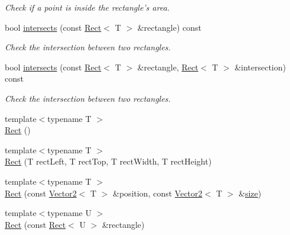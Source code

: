 \begin{DoxyCompactItemize}
\begin{DoxyCompactList}\small\item\em Check if a point is inside the rectangle's area. \end{DoxyCompactList}\item 
bool \hyperlink{classsf_1_1_rect_a566740c8f58e01bb052266f47e7e1011}{intersects} (const \hyperlink{classsf_1_1_rect}{Rect}$<$ T $>$ \&rectangle) const 
\begin{DoxyCompactList}\small\item\em Check the intersection between two rectangles. \end{DoxyCompactList}\item 
bool \hyperlink{classsf_1_1_rect_a5f1874792b04c7e221bb786b31f5836e}{intersects} (const \hyperlink{classsf_1_1_rect}{Rect}$<$ T $>$ \&rectangle, \hyperlink{classsf_1_1_rect}{Rect}$<$ T $>$ \&intersection) const 
\begin{DoxyCompactList}\small\item\em Check the intersection between two rectangles. \end{DoxyCompactList}\item 
{\footnotesize template$<$typename T $>$ }\\\hyperlink{classsf_1_1_rect_a8fbc399054de8bbcd979e9062712896d}{Rect} ()
\item 
{\footnotesize template$<$typename T $>$ }\\\hyperlink{classsf_1_1_rect_a53956cee21c818a3355429e3662fe384}{Rect} (T rect\-Left, T rect\-Top, T rect\-Width, T rect\-Height)
\item 
{\footnotesize template$<$typename T $>$ }\\\hyperlink{classsf_1_1_rect_a7e0ea3f83003ac89b11fd45d581059cc}{Rect} (const \hyperlink{classsf_1_1_vector2}{Vector2}$<$ T $>$ \&position, const \hyperlink{classsf_1_1_vector2}{Vector2}$<$ T $>$ \&\hyperlink{gl3_8h_a79ef9eb3e59c4bb34c4b9fbeb8d28ff7}{size})
\item 
{\footnotesize template$<$typename U $>$ }\\\hyperlink{classsf_1_1_rect_a6fff2bb7e93677839461a66bc2957de0}{Rect} (const \hyperlink{classsf_1_1_rect}{Rect}$<$ U $>$ \&rectangle)
\end{DoxyCompactItemize}
